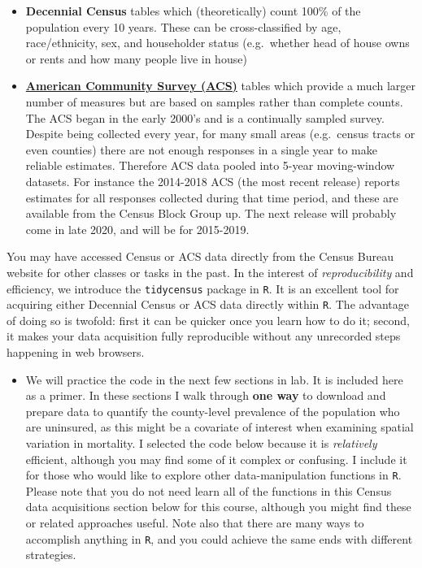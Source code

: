 \documentclass[
]{book}
\newcommand{\passthrough}[1]{#1}
\providecommand{\tightlist}{%
  \setlength{\itemsep}{0pt}\setlength{\parskip}{0pt}}
\newenvironment{rmdblock}[1]
  {%
  \begin{itemize}
  \renewcommand{\labelitemi}{
    \raisebox{-.7\height}[0pt][0pt]{
      {\setkeys{Gin}{width=3em,keepaspectratio}\texttt{[image: images/\#1]}}
    }
  }
  \item
  }
  {
  \end{itemize}
  }
\newenvironment{rmdnote}
  {\begin{rmdblock}{note}}
  {\end{rmdblock}}
\begin{document}
\begin{itemize}
\tightlist
\item
  \textbf{Decennial Census} tables which (theoretically) count 100\% of the population every 10 years. These can be cross-classified by age, race/ethnicity, sex, and householder status (e.g.~whether head of house owns or rents and how many people live in house)
\item
  \textbf{\href{https://www.census.gov/programs-surveys/acs}{American Community Survey (ACS)}} tables which provide a much larger number of measures but are based on samples rather than complete counts. The ACS began in the early 2000's and is a continually sampled survey. Despite being collected every year, for many small areas (e.g.~census tracts or even counties) there are not enough responses in a single year to make reliable estimates. Therefore ACS data pooled into 5-year moving-window datasets. For instance the 2014-2018 ACS (the most recent release) reports estimates for all responses collected during that time period, and these are available from the Census Block Group up. The next release will probably come in late 2020, and will be for 2015-2019.
\end{itemize}

You may have accessed Census or ACS data directly from the Census Bureau website for other classes or tasks in the past. In the interest of \emph{reproducibility} and efficiency, we introduce the \passthrough{\lstinline!tidycensus!} package in \passthrough{\lstinline!R!}. It is an excellent tool for acquiring either Decennial Census or ACS data directly within \passthrough{\lstinline!R!}. The advantage of doing so is twofold: first it can be quicker once you learn how to do it; second, it makes your data acquisition fully reproducible without any unrecorded steps happening in web browsers.

\begin{rmdnote}
We will practice the code in the next few sections in lab. It is included here as a primer. In these sections I walk through \textbf{one way} to download and prepare data to quantify the county-level prevalence of the population who are uninsured, as this might be a covariate of interest when examining spatial variation in mortality. I selected the code below because it is \emph{relatively} efficient, although you may find some of it complex or confusing. I include it for those who would like to explore other data-manipulation functions in \passthrough{\lstinline!R!}. Please note that you do not need learn all of the functions in this Census data acquisitions section below for this course, although you might find these or related approaches useful. Note also that there are many ways to accomplish anything in \passthrough{\lstinline!R!}, and you could achieve the same ends with different strategies.
\end{rmdnote}
\end{document}
